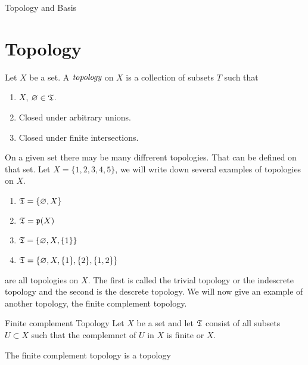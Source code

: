 
\begin{chapter}{Topology and Basis}
    \section{Topology}

    
    \begin{defn}
        Let $X$ be a set. A $\emph{topology}$ on $X$ is a collection of subsets 
        $T$ such that 
        
        \begin{enumerate}
            \item $X$, $\varnothing \in \mathfrak{T}$. 
            \item Closed under arbitrary unions.
            \item Closed under finite intersections. 
        \end{enumerate} 
    \end{defn}

    On a given set there may be many diffrerent topologies. That can be defined on that set. 
    Let $X = \{1, 2, 3, 4, 5\}$, we will write down several examples of topologies on $X$. 
    
    \begin{enumerate}
        \item $\mathfrak{T} = \{\varnothing, X\}$
        \item $\mathfrak{T} = \mathfrak{p}(X)$
        \item $\mathfrak{T} = \{\varnothing, X, \{1\}\}$
        \item $\mathfrak{T} = \{\varnothing, X, \{1\}, \{2\}, \{1,2\}\}$
    \end{enumerate}

    are all topologies on $X$. The first is called the trivial topology or the indescrete topology and the second is the descrete topology. We 
    will now give an example of another topology, the finite complement topology. 

    
    \begin{defn}{Finite complement Topology}
        Let $X$ be a set and let $\mathfrak{T}$ consist of all subsets $U \subset X$ such that the complemnet of $U$ in $X$ is finite 
        or $X$. 
    \end{defn}

    
    \begin{prop}
        The finite complement topology is a topology
    \end{prop}


\end{chapter}

